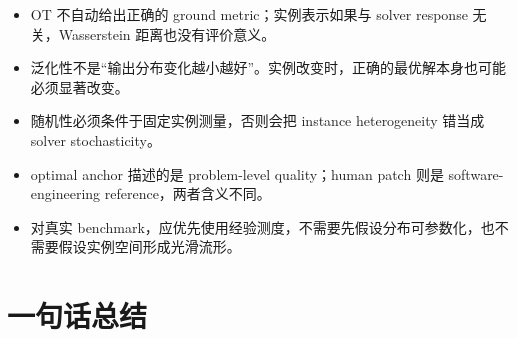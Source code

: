 \documentclass[11pt,a4paper]{ctexart}
\begin{document}
\begin{itemize}
\item OT 不自动给出正确的 ground metric；实例表示如果与 solver response 无关，Wasserstein 距离也没有评价意义。
\item 泛化性不是“输出分布变化越小越好”。实例改变时，正确的最优解本身也可能必须显著改变。
\item 随机性必须条件于固定实例测量，否则会把 instance heterogeneity 错当成 solver stochasticity。
\item optimal anchor 描述的是 problem-level quality；human patch 则是 software-engineering reference，两者含义不同。
\item 对真实 benchmark，应优先使用经验测度，不需要先假设分布可参数化，也不需要假设实例空间形成光滑流形。
\end{itemize}

\section{一句话总结}

\begin{center}
\end{center}
\end{document}
